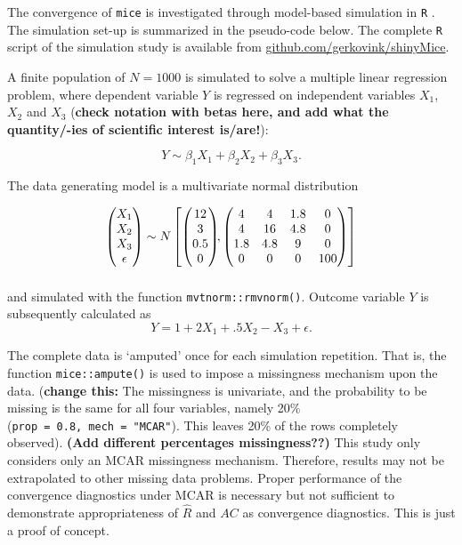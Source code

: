 \documentclass[Royal,times,sageh]{sagej}
\begin{document}
The convergence of \texttt{mice} is investigated through model-based
simulation in \texttt{R} \citep[version 3.6.3;][]{R}. The simulation
set-up is summarized in the pseudo-code below. The complete \texttt{R}
script of the simulation study is available from
\href{https://github.com/gerkovink/shinyMice/tree/master/3.Thesis/1.SimulationStudy}{github.com/gerkovink/shinyMice}.

A finite population of \(N=1000\) is simulated to solve a multiple
linear regression problem, where dependent variable \(Y\) is regressed
on independent variables \(X_1\), \(X_2\) and \(X_3\) (\textbf{check
notation with betas here, and add what the quantity/-ies of scientific
interest is/are!}):

\[Y \sim \beta_1 X_1 + \beta_2 X_2 + \beta_3 X_3.\]

The data generating model is a multivariate normal distribution

\begin{align*}
\begin{pmatrix}X_1\\
X_2\\
X_3\\
\epsilon
\end{pmatrix} \sim  N
\begin{bmatrix}
\begin{pmatrix}
12\\
3\\
0.5\\
0
\end{pmatrix}\!\!,
\begin{pmatrix}
4 & 4 & 1.8 & 0\\
4 & 16 & 4.8 & 0\\
1.8 & 4.8 & 9 & 0\\
0 & 0 & 0 & 100
\end{pmatrix}
\end{bmatrix}\\[2\jot]
\end{align*}

and simulated with the function \texttt{mvtnorm::rmvnorm()}. Outcome
variable \(Y\) is subsequently calculated as
\[Y =  1 + 2X_1 + .5X_2 - X_3 + \epsilon .\]

The complete data is `amputed' once for each simulation repetition. That
is, the function \texttt{mice::ampute()} is used to impose a missingness
mechanism upon the data. (\textbf{change this:} The missingness is
univariate, and the probability to be missing is the same for all four
variables, namely 20\% (\texttt{prop\ =\ 0.8,\ mech\ =\ "MCAR"}). This
leaves 20\% of the rows completely observed). \textbf{(Add different
percentages missingness??)} This study only considers only an MCAR
missingness mechanism. Therefore, results may not be extrapolated to
other missing data problems. Proper performance of the convergence
diagnostics under MCAR is necessary but not sufficient to demonstrate
appropriateness of \(\widehat{R}\) and \(AC\) as convergence
diagnostics. This is just a proof of concept.
\end{document}
